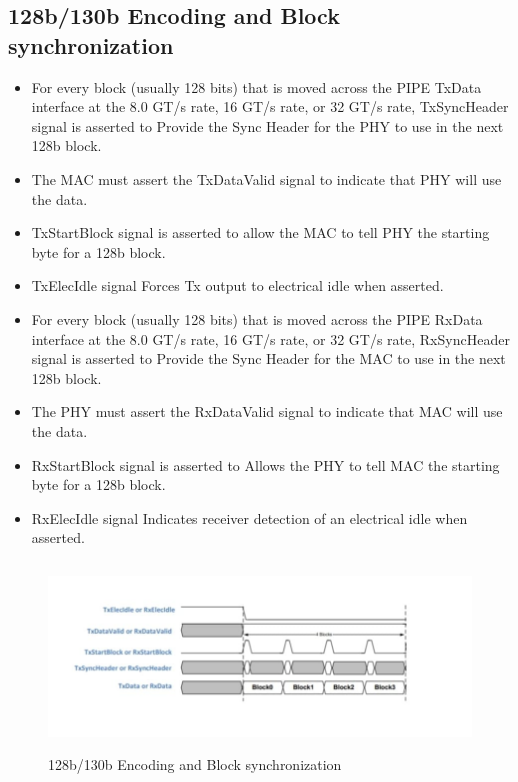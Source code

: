 \subsection{128b/130b Encoding and Block synchronization}
\begin{itemize}
    \item For every block (usually 128 bits) that is moved across the PIPE TxData interface at the 8.0 GT/s rate, 16 GT/s rate, or 32 GT/s rate, TxSyncHeader signal is asserted to Provide the Sync Header for the PHY to use in the next 128b block.

    \item The MAC must assert the TxDataValid signal to indicate that PHY will use the data.
    \item TxStartBlock signal is asserted to allow the MAC to tell PHY the starting byte for a 128b block.

    \item TxElecIdle signal Forces Tx output to electrical idle when asserted.

    \item For every block (usually 128 bits) that is moved across the PIPE RxData interface at the 8.0 GT/s rate, 16 GT/s rate, or 32 GT/s rate, RxSyncHeader signal is asserted to Provide the Sync Header for the MAC to use in the next 128b block.

    \item The PHY must assert the RxDataValid signal to indicate that MAC will use the data.

    \item RxStartBlock signal is asserted to Allows the PHY to tell MAC the starting byte for a 128b block.

    \item RxElecIdle signal Indicates receiver detection of an electrical idle when asserted.
\end{itemize}
\begin{figure}[H]
  \centering
  \includegraphics[width=130mm,height=50mm]{images/clk_diagram/end.jpeg}
  \caption{128b/130b Encoding and Block synchronization}
  \label{lane}
\end{figure}

